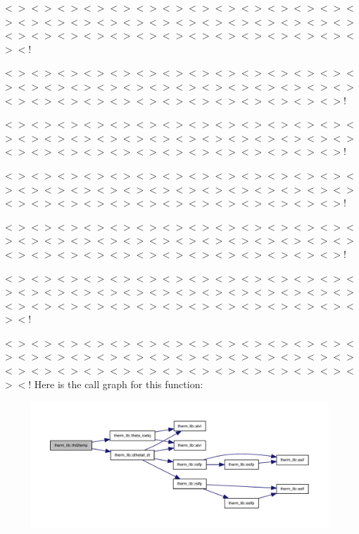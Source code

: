 $<$$>$$<$$>$$<$$>$$<$$>$$<$$>$$<$$>$$<$$>$$<$$>$$<$$>$$<$$>$$<$$>$$<$$>$$<$$>$$<$$>$$<$$>$$<$$>$$<$$>$$<$$>$$<$$>$$<$$>$$<$$>$$<$$>$$<$$>$$<$$>$$<$$>$$<$$>$$<$$>$$<$$>$$<$$>$$<$$>$$<$$>$$<$$>$$<$$>$$<$$>$$<$$>$$<$$>$$<$$>$$<$$>$$<$$>$$<$$>$$<$$>$$<$!

$<$$>$$<$$>$$<$$>$$<$$>$$<$$>$$<$$>$$<$$>$$<$$>$$<$$>$$<$$>$$<$$>$$<$$>$$<$$>$$<$$>$$<$$>$$<$$>$$<$$>$$<$$>$$<$$>$$<$$>$$<$$>$$<$$>$$<$$>$$<$$>$$<$$>$$<$$>$$<$$>$$<$$>$$<$$>$$<$$>$$<$$>$$<$$>$$<$$>$$<$$>$$<$$>$$<$$>$$<$$>$$<$$>$$<$$>$$<$$>$!

$<$$>$$<$$>$$<$$>$$<$$>$$<$$>$$<$$>$$<$$>$$<$$>$$<$$>$$<$$>$$<$$>$$<$$>$$<$$>$$<$$>$$<$$>$$<$$>$$<$$>$$<$$>$$<$$>$$<$$>$$<$$>$$<$$>$$<$$>$$<$$>$$<$$>$$<$$>$$<$$>$$<$$>$$<$$>$$<$$>$$<$$>$$<$$>$$<$$>$$<$$>$$<$$>$$<$$>$$<$$>$$<$$>$$<$$>$$<$$>$!

$<$$>$$<$$>$$<$$>$$<$$>$$<$$>$$<$$>$$<$$>$$<$$>$$<$$>$$<$$>$$<$$>$$<$$>$$<$$>$$<$$>$$<$$>$$<$$>$$<$$>$$<$$>$$<$$>$$<$$>$$<$$>$$<$$>$$<$$>$$<$$>$$<$$>$$<$$>$$<$$>$$<$$>$$<$$>$$<$$>$$<$$>$$<$$>$$<$$>$$<$$>$$<$$>$$<$$>$$<$$>$$<$$>$$<$$>$$<$$>$!

$<$$>$$<$$>$$<$$>$$<$$>$$<$$>$$<$$>$$<$$>$$<$$>$$<$$>$$<$$>$$<$$>$$<$$>$$<$$>$$<$$>$$<$$>$$<$$>$$<$$>$$<$$>$$<$$>$$<$$>$$<$$>$$<$$>$$<$$>$$<$$>$$<$$>$$<$$>$$<$$>$$<$$>$$<$$>$$<$$>$$<$$>$$<$$>$$<$$>$$<$$>$$<$$>$$<$$>$$<$$>$$<$$>$$<$$>$$<$$>$!

$<$$>$$<$$>$$<$$>$$<$$>$$<$$>$$<$$>$$<$$>$$<$$>$$<$$>$$<$$>$$<$$>$$<$$>$$<$$>$$<$$>$$<$$>$$<$$>$$<$$>$$<$$>$$<$$>$$<$$>$$<$$>$$<$$>$$<$$>$$<$$>$$<$$>$$<$$>$$<$$>$$<$$>$$<$$>$$<$$>$$<$$>$$<$$>$$<$$>$$<$$>$$<$$>$$<$$>$$<$$>$$<$$>$$<$$>$$<$$>$$<$$>$$<$!

$<$$>$$<$$>$$<$$>$$<$$>$$<$$>$$<$$>$$<$$>$$<$$>$$<$$>$$<$$>$$<$$>$$<$$>$$<$$>$$<$$>$$<$$>$$<$$>$$<$$>$$<$$>$$<$$>$$<$$>$$<$$>$$<$$>$$<$$>$$<$$>$$<$$>$$<$$>$$<$$>$$<$$>$$<$$>$$<$$>$$<$$>$$<$$>$$<$$>$$<$$>$$<$$>$$<$$>$$<$$>$$<$$>$$<$$>$$<$$>$$<$$>$$<$! Here is the call graph for this function\+:
\nopagebreak
\begin{figure}[H]
\begin{center}
\leavevmode
\includegraphics[width=350pt]{namespacetherm__lib_ac1f38c4afbbc3cf5a540d4e87c8b22c8_cgraph}
\end{center}
\end{figure}
\mbox{\label{namespacetherm__lib_a8fda8004633d91addcf1c6004df3bd88}} 

